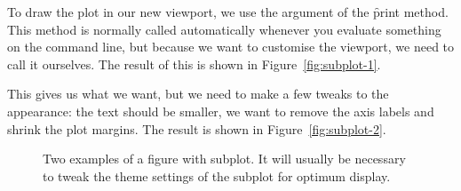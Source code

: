 To draw the plot in our new viewport, we use the  argument of the  \f{print} method.  This method is normally called automatically whenever you evaluate something on the command line, but because we want to customise the viewport, we need to call it ourselves.  The result of this is shown in Figure~\ref{fig:subplot-1}.

% 


This gives us what we want, but we need to make a few tweaks to the appearance: the text should be smaller, we want to remove the axis labels and shrink the plot margins.  The result is shown in Figure~\ref{fig:subplot-2}.

% 
% 


\begin{figure}[htbp]
  \centering
  \caption{Two examples of a figure with subplot. It will usually be necessary to tweak the theme settings of the subplot for optimum display.}
  \label{fig:subplot}
\end{figure}

